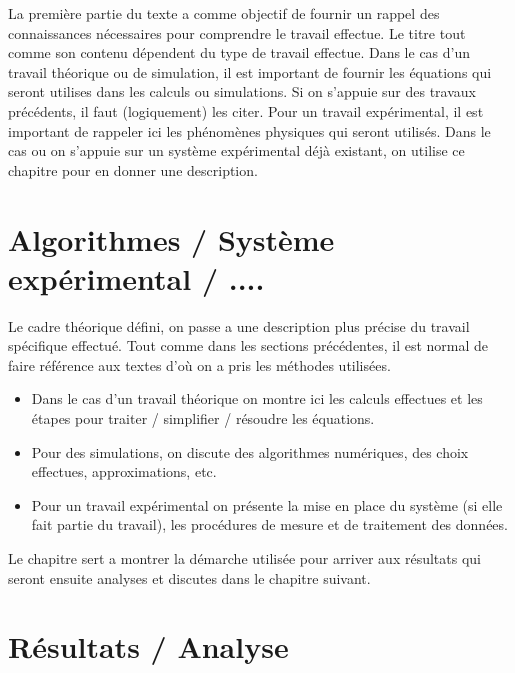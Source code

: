 \documentclass[11pt,a4paper]{report}
\begin{document}
La première partie du texte a comme objectif de fournir un rappel des
connaissances nécessaires pour comprendre le travail effectue.  Le
titre tout comme son contenu dépendent du type de travail effectue.
Dans le cas d'un travail théorique ou de simulation, il est important de fournir les équations qui seront utilises dans les calculs ou simulations.  Si on s'appuie sur des travaux précédents, il faut (logiquement) les citer\cite{Article01}.  Pour un travail expérimental, il est important de
rappeler ici les phénomènes physiques qui seront utilisés.  Dans le
cas ou on s'appuie sur un système expérimental déjà existant, on
utilise ce chapitre pour en donner une description.



\chapter{Algorithmes / Système expérimental / ....}

Le cadre théorique défini, on passe a une description plus précise du
travail spécifique effectué.  Tout comme dans les sections précédentes, il est normal de faire référence\cite{Livre01,Chapitre01} aux textes d'où on a pris les méthodes utilisées.

\begin{itemize}
\item Dans le cas d'un travail théorique on montre ici les calculs
  effectues et les étapes pour traiter / simplifier / résoudre les
  équations.
\item Pour des simulations, on discute des algorithmes numériques, 
  des choix effectues, approximations, etc.
\item Pour un travail expérimental on présente la mise en place du
  système (si elle fait partie du travail), les procédures de mesure
  et de traitement des données.
\end{itemize}

Le chapitre sert a montrer la démarche utilisée pour arriver aux
résultats qui seront ensuite analyses et discutes dans le chapitre
suivant.



\chapter{Résultats / Analyse}
\end{document}
